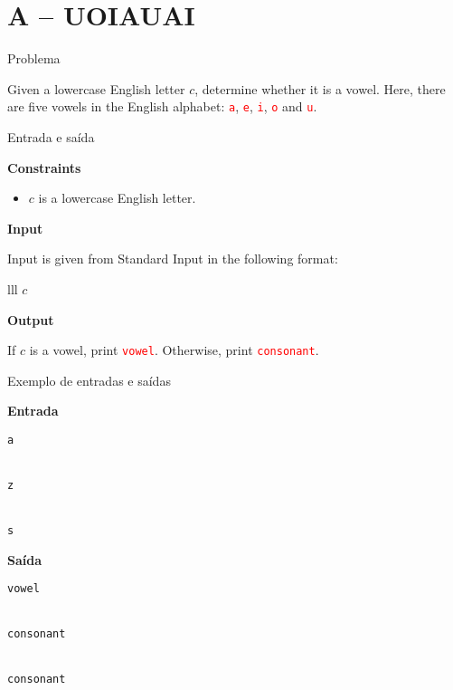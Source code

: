 \section{A -- UOIAUAI}

\begin{frame}[fragile]{Problema}

Given a lowercase English letter $c$, determine whether it is a vowel. Here, there are five 
vowels in the English alphabet: \texttt{\textcolor{red}{a}}, \texttt{\textcolor{red}{e}},
\texttt{\textcolor{red}{i}}, \texttt{\textcolor{red}{o}} and \texttt{\textcolor{red}{u}}.

\end{frame}

\begin{frame}[fragile]{Entrada e saída}

\textbf{Constraints}

\begin{itemize}
    \item $c$ is a lowercase English letter.
\end{itemize}

\vspace{0.1in}

\textbf{Input}

Input is given from Standard Input in the following format:
\begin{atcoderio}{lll}
$c$ \\
\end{atcoderio}

\textbf{Output}

If $c$ is a vowel, print \texttt{\textcolor{red}{vowel}}. Otherwise, print
\texttt{\textcolor{red}{consonant}}.

\end{frame}

\begin{frame}[fragile]{Exemplo de entradas e saídas}

\begin{minipage}[t]{0.55\textwidth}
\textbf{Entrada}
\begin{verbatim}
a


z


s
\end{verbatim}
\end{minipage}
\begin{minipage}[t]{0.4\textwidth}
\textbf{Saída}
\begin{verbatim}
vowel


consonant


consonant
\end{verbatim}
\end{minipage}
\end{frame}

